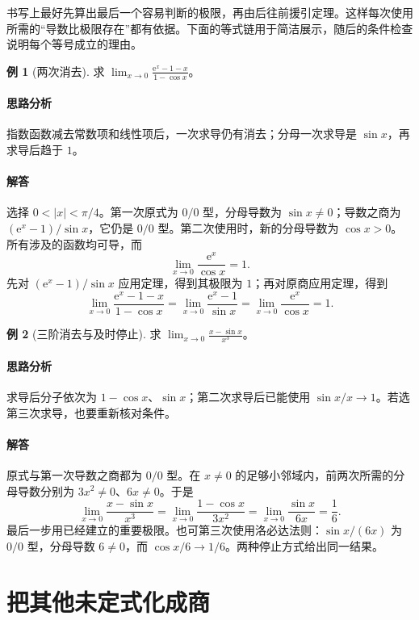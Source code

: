\documentclass[UTF8,fontset=fandol,12pt,oneside,openany]{ctexrep}
\newcommand{\ee}{\mathrm e}
\theoremstyle{definition}
\newtheorem{example}{例}[chapter]
\begin{document}
书写上最好先算出最后一个容易判断的极限，再由后往前援引定理。这样每次使用所需的“导数比极限存在”都有依据。下面的等式链用于简洁展示，随后的条件检查说明每个等号成立的理由。

\begin{example}[两次消去]
求 $\displaystyle\lim_{x\to0}\frac{\ee^x-1-x}{1-\cos x}$。
\end{example}
\paragraph{思路分析}
指数函数减去常数项和线性项后，一次求导仍有消去；分母一次求导是 $\sin x$，再求导后趋于 $1$。
\paragraph{解答}
选择 $0<|x|<\pi/4$。第一次原式为 $0/0$ 型，分母导数为 $\sin x\ne0$；导数之商为 $(\ee^x-1)/\sin x$，它仍是 $0/0$ 型。第二次使用时，新的分母导数为 $\cos x>0$。所有涉及的函数均可导，而
\[
\lim_{x\to0}\frac{\ee^x}{\cos x}=1.
\]
先对 $(\ee^x-1)/\sin x$ 应用定理，得到其极限为 $1$；再对原商应用定理，得到
\[
\lim_{x\to0}\frac{\ee^x-1-x}{1-\cos x}
=\lim_{x\to0}\frac{\ee^x-1}{\sin x}
=\lim_{x\to0}\frac{\ee^x}{\cos x}=1.
\]

\begin{example}[三阶消去与及时停止]
求 $\displaystyle\lim_{x\to0}\frac{x-\sin x}{x^3}$。
\end{example}
\paragraph{思路分析}
求导后分子依次为 $1-\cos x$、$\sin x$；第二次求导后已能使用 $\sin x/x\to1$。若选第三次求导，也要重新核对条件。
\paragraph{解答}
原式与第一次导数之商都为 $0/0$ 型。在 $x\ne0$ 的足够小邻域内，前两次所需的分母导数分别为 $3x^2\ne0$、$6x\ne0$。于是
\[
\lim_{x\to0}\frac{x-\sin x}{x^3}
=\lim_{x\to0}\frac{1-\cos x}{3x^2}
=\lim_{x\to0}\frac{\sin x}{6x}
=\frac16.
\]
最后一步用已经建立的重要极限。也可第三次使用洛必达法则：$\sin x/(6x)$ 为 $0/0$ 型，分母导数 $6\ne0$，而 $\cos x/6\to1/6$。两种停止方式给出同一结果。

\section{把其他未定式化成商}
\label{lec:07:transforms}
\end{document}
